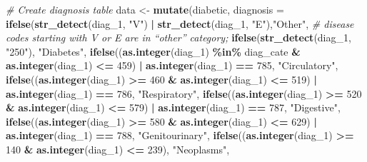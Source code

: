 \documentclass[
]{article}
\newenvironment{Shaded}{\begin{snugshade}}{\end{snugshade}}
\newcommand{\AttributeTok}[1]{\textcolor[rgb]{0.13,0.29,0.53}{#1}}
\newcommand{\CommentTok}[1]{\textcolor[rgb]{0.56,0.35,0.01}{\textit{#1}}}
\newcommand{\DecValTok}[1]{\textcolor[rgb]{0.00,0.00,0.81}{#1}}
\newcommand{\FunctionTok}[1]{\textcolor[rgb]{0.13,0.29,0.53}{\textbf{#1}}}
\newcommand{\NormalTok}[1]{#1}
\newcommand{\OtherTok}[1]{\textcolor[rgb]{0.56,0.35,0.01}{#1}}
\newcommand{\SpecialCharTok}[1]{\textcolor[rgb]{0.81,0.36,0.00}{\textbf{#1}}}
\newcommand{\StringTok}[1]{\textcolor[rgb]{0.31,0.60,0.02}{#1}}
\begin{document}
\begin{Shaded}
\begin{Highlighting}[]
\CommentTok{\# Create diagnosis table }
\NormalTok{data }\OtherTok{\textless{}{-}} \FunctionTok{mutate}\NormalTok{(diabetic, }\AttributeTok{diagnosis =}
         \FunctionTok{ifelse}\NormalTok{(}\FunctionTok{str\_detect}\NormalTok{(diag\_1, }\StringTok{"V"}\NormalTok{) }\SpecialCharTok{|} \FunctionTok{str\_detect}\NormalTok{(diag\_1, }\StringTok{"E"}\NormalTok{),}\StringTok{"Other"}\NormalTok{, }
                \CommentTok{\# disease codes starting with V or E are in “other” category;}
                \FunctionTok{ifelse}\NormalTok{(}\FunctionTok{str\_detect}\NormalTok{(diag\_1, }\StringTok{"250"}\NormalTok{), }\StringTok{"Diabetes"}\NormalTok{,}
                       \FunctionTok{ifelse}\NormalTok{((}\FunctionTok{as.integer}\NormalTok{(diag\_1) }\SpecialCharTok{\%in\%}\NormalTok{ diag\_cate }\SpecialCharTok{\&} \FunctionTok{as.integer}\NormalTok{(diag\_1) }\SpecialCharTok{\textless{}=} \DecValTok{459}\NormalTok{) }\SpecialCharTok{|} \FunctionTok{as.integer}\NormalTok{(diag\_1) }\SpecialCharTok{==} \DecValTok{785}\NormalTok{, }\StringTok{"Circulatory"}\NormalTok{,}
                              \FunctionTok{ifelse}\NormalTok{((}\FunctionTok{as.integer}\NormalTok{(diag\_1) }\SpecialCharTok{\textgreater{}=} \DecValTok{460} \SpecialCharTok{\&} \FunctionTok{as.integer}\NormalTok{(diag\_1) }\SpecialCharTok{\textless{}=} \DecValTok{519}\NormalTok{) }\SpecialCharTok{|} \FunctionTok{as.integer}\NormalTok{(diag\_1) }\SpecialCharTok{==} \DecValTok{786}\NormalTok{, }\StringTok{"Respiratory"}\NormalTok{, }
                                     \FunctionTok{ifelse}\NormalTok{((}\FunctionTok{as.integer}\NormalTok{(diag\_1) }\SpecialCharTok{\textgreater{}=} \DecValTok{520} \SpecialCharTok{\&} \FunctionTok{as.integer}\NormalTok{(diag\_1) }\SpecialCharTok{\textless{}=} \DecValTok{579}\NormalTok{) }\SpecialCharTok{|} \FunctionTok{as.integer}\NormalTok{(diag\_1) }\SpecialCharTok{==} \DecValTok{787}\NormalTok{, }\StringTok{"Digestive"}\NormalTok{, }
                                            \FunctionTok{ifelse}\NormalTok{((}\FunctionTok{as.integer}\NormalTok{(diag\_1) }\SpecialCharTok{\textgreater{}=} \DecValTok{580} \SpecialCharTok{\&} \FunctionTok{as.integer}\NormalTok{(diag\_1) }\SpecialCharTok{\textless{}=} \DecValTok{629}\NormalTok{) }\SpecialCharTok{|} \FunctionTok{as.integer}\NormalTok{(diag\_1) }\SpecialCharTok{==} \DecValTok{788}\NormalTok{, }\StringTok{"Genitourinary"}\NormalTok{,}
                                                   \FunctionTok{ifelse}\NormalTok{((}\FunctionTok{as.integer}\NormalTok{(diag\_1) }\SpecialCharTok{\textgreater{}=} \DecValTok{140} \SpecialCharTok{\&} \FunctionTok{as.integer}\NormalTok{(diag\_1) }\SpecialCharTok{\textless{}=} \DecValTok{239}\NormalTok{), }\StringTok{"Neoplasms"}\NormalTok{,  }

\end{Highlighting}
\end{Shaded}
\end{document}
